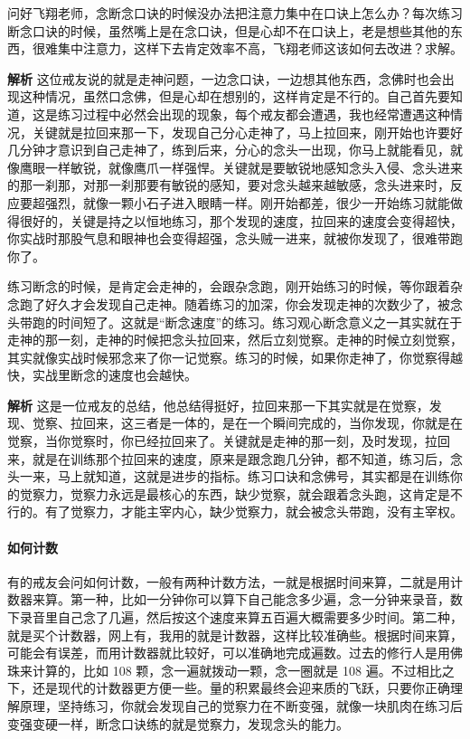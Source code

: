\begin{case}[练习过程中的问题]
    问好飞翔老师，念断念口诀的时候没办法把注意力集中在口诀上怎么办？每次练习断念口诀的时候，虽然嘴上是在念口诀，但是心却不在口诀上，老是想些其他的东西，很难集中注意力，这样下去肯定效率不高，飞翔老师这该如何去改进？求解。

    \textbf{解析} 这位戒友说的就是走神问题，一边念口诀，一边想其他东西，念佛时也会出现这种情况，虽然口念佛，但是心却在想别的，这样肯定是不行的。自己首先要知道，这是练习过程中必然会出现的现象，每个戒友都会遭遇，我也经常遭遇这种情况，关键就是拉回来那一下，发现自己分心走神了，马上拉回来，刚开始也许要好几分钟才意识到自己走神了，练到后来，分心的念头一出现，你马上就能看见，就像鹰眼一样敏锐，就像鹰爪一样强悍。关键就是要敏锐地感知念头入侵、念头进来的那一刹那，对那一刹那要有敏锐的感知，要对念头越来越敏感，念头进来时，反应要超强烈，就像一颗小石子进入眼睛一样。刚开始都差，很少一开始练习就能做得很好的，关键是持之以恒地练习，那个发现的速度，拉回来的速度会变得超快，你实战时那股气息和眼神也会变得超强，念头贼一进来，就被你发现了，很难带跑你了。
\end{case}

\begin{case}[练习过程中的问题]
    练习断念的时候，是肯定会走神的，会跟杂念跑，刚开始练习的时候，等你跟着杂念跑了好久才会发现自己走神。随着练习的加深，你会发现走神的次数少了，被念头带跑的时间短了。这就是“断念速度”的练习。练习观心断念意义之一其实就在于走神的那一刻，走神的时候把念头拉回来，然后立刻觉察。走神的时候立刻觉察，其实就像实战时候邪念来了你一记觉察。练习的时候，如果你走神了，你觉察得越快，实战里断念的速度也会越快。

    \textbf{解析} 这是一位戒友的总结，他总结得挺好，拉回来那一下其实就是在觉察，发现、觉察、拉回来，这三者是一体的，是在一个瞬间完成的，当你发现，你就是在觉察，当你觉察时，你已经拉回来了。关键就是走神的那一刻，及时发现，拉回来，就是在训练那个拉回来的速度，原来是跟念跑几分钟，都不知道，练习后，念头一来，马上就知道，这就是进步的指标。练习口诀和念佛号，其实都是在训练你的觉察力，觉察力永远是最核心的东西，缺少觉察，就会跟着念头跑，这肯定是不行的。有了觉察力，才能主宰内心，缺少觉察力，就会被念头带跑，没有主宰权。
\end{case}

\paragraph{如何计数}

有的戒友会问如何计数，一般有两种计数方法，一就是根据时间来算，二就是用计数器来算。第一种，比如一分钟你可以算下自己能念多少遍，念一分钟来录音，数下录音里自己念了几遍，然后按这个速度来算五百遍大概需要多少时间。第二种，就是买个计数器，网上有，我用的就是计数器，这样比较准确些。根据时间来算，可能会有误差，而用计数器就比较好，可以准确地完成遍数。过去的修行人是用佛珠来计算的，比如 108 颗，念一遍就拨动一颗，念一圈就是 108 遍。不过相比之下，还是现代的计数器更方便一些。量的积累最终会迎来质的飞跃，只要你正确理解原理，坚持练习，你就会发现自己的觉察力在不断变强，就像一块肌肉在练习后变强变硬一样，断念口诀练的就是觉察力，发现念头的能力。

